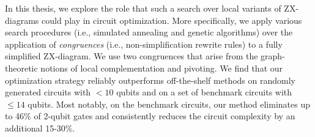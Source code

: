 In this thesis, we explore the role that such a search over local variants of ZX-diagrams could play in circuit optimization.
More specifically, we apply various search procedures (i.e., simulated annealing and genetic algorithms) over the application of \emph{congruences} (i.e., non-simplification rewrite rules) to a fully simplified ZX-diagram.
We use two congruences that arise from the graph-theoretic notions of local complementation and pivoting.
We find that our optimization strategy reliably outperforms off-the-shelf methods on randomly generated circuits with $<10$ qubits and on a set of benchmark circuits with $\leq 14$ qubits.
Most notably, on the benchmark circuits, our method eliminates up to 46\% of 2-qubit gates and consistently reduces the circuit complexity by an additional 15-30\%.
